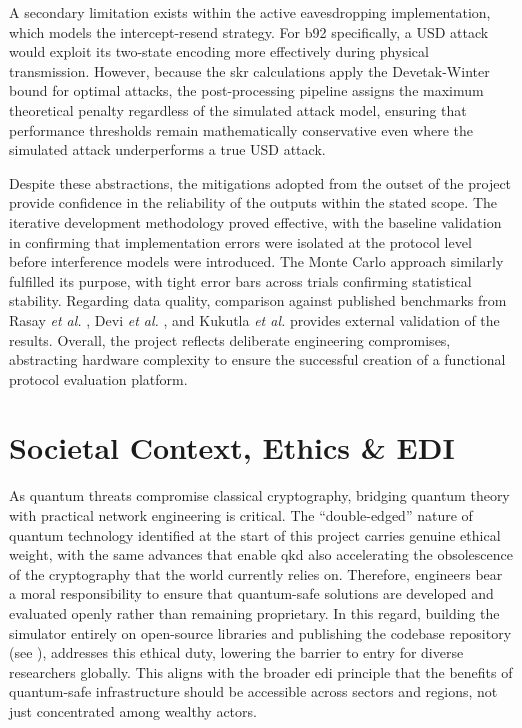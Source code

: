 \documentclass[11pt, a4paper]{report}
\begin{document}
A secondary limitation exists within the active eavesdropping implementation, which models the intercept-resend strategy. For \gls{b92} specifically, a USD attack would exploit its two-state encoding more effectively during physical transmission. However, because the \gls{skr} calculations apply the Devetak-Winter bound for optimal attacks, the post-processing pipeline assigns the maximum theoretical penalty regardless of the simulated attack model, ensuring that performance thresholds remain mathematically conservative even where the simulated attack underperforms a true USD attack.

Despite these abstractions, the mitigations adopted from the outset of the project provide confidence in the reliability of the outputs within the stated scope. The iterative development methodology proved effective, with the baseline validation in  confirming that implementation errors were isolated at the protocol level before interference models were introduced. The Monte Carlo approach similarly fulfilled its purpose, with tight error bars across trials confirming statistical stability. Regarding data quality, comparison against published benchmarks from Rasay \textit{et al.} \cite{rasay2026}, Devi \textit{et al.} \cite{devi2025}, and Kukutla \textit{et al.} \cite{kukutla2025} provides external validation of the results. Overall, the project reflects deliberate engineering compromises, abstracting hardware complexity to ensure the successful creation of a functional protocol evaluation platform.

\section{Societal Context, Ethics \& EDI}
\label{sec:context}
As quantum threats compromise classical cryptography, bridging quantum theory with practical network engineering is critical. The ``double-edged'' nature of quantum technology identified at the start of this project carries genuine ethical weight, with the same advances that enable \gls{qkd} also accelerating the obsolescence of the cryptography that the world currently relies on. Therefore, engineers bear a moral responsibility to ensure that quantum-safe solutions are developed and evaluated openly rather than remaining proprietary. In this regard, building the simulator entirely on open-source libraries and publishing the codebase repository (see ), addresses this ethical duty, lowering the barrier to entry for diverse researchers globally. This aligns with the broader \gls{edi} principle that the benefits of quantum-safe infrastructure should be accessible across sectors and regions, not just concentrated among wealthy actors.
\end{document}
